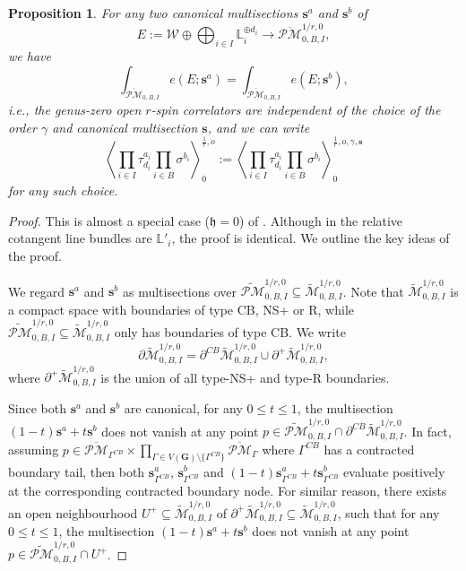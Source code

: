 \documentclass[11pt]{amsart}
\newtheorem{prop}[dummy]{Proposition}
\theoremstyle{definition}
\theoremstyle{remark}
\newcommand{\oPMb}{{\overline{\mathcal{PM}}}}
\newcommand{\<}{\left<}
\renewcommand{\>}{\right>}
\numberwithin{equation}{section}
\def\h{{\mathfrak h}}
\begin{document}
     \begin{prop}\label{prop independent of choice g=0}
    For any two canonical multisections $\mathbf{s}^a$ and $\mathbf{s}^b$ of 
    $$E:=\mathcal W\oplus \bigoplus_{i\in I} \mathbb L_i^{\oplus d_i}\to \oPMb^{1/r,0}_{0,B,I},$$
    we have 
    $$
    \int_{\oPMb_{0,B,I}}e(E ; \mathbf{s}^a)=\int_{\oPMb_{0,B,I}}e(E ; \mathbf{s}^b),
    $$
    \textit{i.e.,} the genus-zero open $r$-spin correlators are independent of the choice of the order $\gamma$ and canonical multisection $\bm{s}$, and we can write 
    $$\left\langle \prod_{i\in I}\tau^{a_i}_{d_i}\prod_{i \in B}\sigma^{b_i}\right\rangle^{\frac{1}{r},o}_0:=\left\langle \prod_{i\in I}\tau^{a_i}_{d_i}\prod_{i \in B}\sigma^{b_i}\right\rangle^{\frac{1}{r},o,\gamma,\mathbf{s}}_0$$
    for any such choice.
    \end{prop}
    \begin{proof}
        This is almost a special case ($\h=0$) of \cite[Theorem 3.9]{TZ2}. Although in \cite{TZ2} the relative cotangent line bundles are $\mathbb L'_i$,  the proof is identical. We outline the key ideas of the proof. 

        We regard $\mathbf{s}^a$ and $\mathbf{s}^b$ as multisections over $\widetilde{\mathcal{PM}}^{1/r,0}_{0,B,I}\subseteq \widetilde{\mathcal{M}}^{1/r,0}_{0,B,I}$. Note that $\widetilde{\mathcal{M}}^{1/r,0}_{0,B,I}$ is a compact space with boundaries of type CB, NS+ or R, while $\widetilde{\mathcal{PM}}^{1/r,0}_{0,B,I}\subseteq \widetilde{\mathcal{M}}^{1/r,0}_{0,B,I}$ only has  boundaries of type CB. We write 
        $$
        \partial \widetilde{\mathcal{M}}^{1/r,0}_{0,B,I}= \partial^{CB}\widetilde{\mathcal{M}}^{1/r,0}_{0,B,I} \cup \partial^+ \widetilde{\mathcal{M}}^{1/r,0}_{0,B,I},
        $$
        where $\partial^+ \widetilde{\mathcal{M}}^{1/r,0}_{0,B,I}$ is the union of all type-NS+ and type-R boundaries.
        
        Since both $\mathbf{s}^a$ and $\mathbf{s}^b$ are canonical, for any $0\le t \le 1$, the multisection $(1-t)\mathbf{s}^a+t\mathbf{s}^b$ does not vanish at any point  $p\in \widetilde{\mathcal{PM}}^{1/r,0}_{0,B,I} \cap \partial^{CB}\widetilde{\mathcal{M}}^{1/r,0}_{0,B,I}$. In fact, assuming $p\in \oPMb_{\Gamma^{CB}}\times \prod_{\Gamma\in V(\mathbf{G})\setminus \{\Gamma^{CB}\}}\oPMb_{\Gamma}$ where $\Gamma^{CB}$ has a contracted boundary tail, then both $\mathbf{s}^a_{\Gamma^{CB}}$,  $\mathbf{s}^b_{\Gamma^{CB}}$ and $(1-t)\mathbf{s}^a_{\Gamma^{CB}}+t\mathbf{s}^b_{\Gamma^{CB}}$
        evaluate positively at the corresponding contracted boundary node. For similar reason, there exists an open neighbourhood $U^+\subseteq \widetilde{\mathcal{M}}^{1/r,0}_{0,B,I}$ of $\partial^+ \widetilde{\mathcal{M}}^{1/r,0}_{0,B,I}\subseteq \widetilde{\mathcal{M}}^{1/r,0}_{0,B,I}$, such that for any $0\le t \le 1$, the multisection $(1-t)\mathbf{s}^a+t\mathbf{s}^b$ does not vanish at any point  $p\in \widetilde{\mathcal{PM}}^{1/r,0}_{0,B,I} \cap U^+$.


\end{proof}
\end{document}
